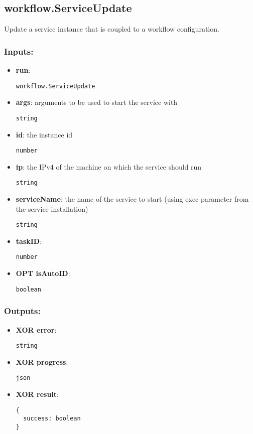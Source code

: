 \subsection{workflow.ServiceUpdate}
\label{ch:builtinservices:workflow.ServiceUpdate}
Update a service instance that is coupled to a workflow configuration.
\subsubsection*{Inputs:}
\begin{itemize}
  \small
    \item \textbf{run}: 
\begin{lstlisting}
workflow.ServiceUpdate
\end{lstlisting}
    \item \textbf{args}: arguments to be used to start the service with
\begin{lstlisting}
string
\end{lstlisting}
    \item \textbf{id}: the instance id
\begin{lstlisting}
number
\end{lstlisting}
    \item \textbf{ip}: the IPv4 of the machine on which the service should run
\begin{lstlisting}
string
\end{lstlisting}
    \item \textbf{serviceName}: the name of the service to start (using exec parameter from the service installation)
\begin{lstlisting}
string
\end{lstlisting}
    \item \textbf{taskID}: 
\begin{lstlisting}
number
\end{lstlisting}
    \item \textbf{OPT isAutoID}: 
\begin{lstlisting}
boolean
\end{lstlisting}
  \end{itemize}
\subsubsection*{Outputs:}
\begin{itemize}
  \small
    \item \textbf{XOR error}: 
\begin{lstlisting}
string
\end{lstlisting}
    \item \textbf{XOR progress}: 
\begin{lstlisting}
json
\end{lstlisting}
    \item \textbf{XOR result}: 
\begin{lstlisting}
{
  success: boolean
}
\end{lstlisting}
  \end{itemize}

